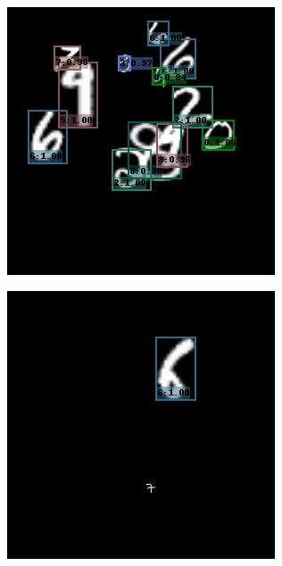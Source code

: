 \begin{figure}
\begin{subfigure}[b]{0.49\textwidth}
  \end{subfigure}
  ~
  \begin{subfigure}[b]{0.49\textwidth}
    \centering
    \includegraphics[width=\textwidth]{figures/8.png}
  \end{subfigure}
  \begin{subfigure}[b]{0.49\textwidth}
    \centering
    \includegraphics[width=\textwidth]{figures/9.png}

\end{subfigure}
\end{figure}
